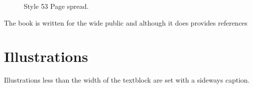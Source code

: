 \begin{figure}[ht]
\caption{Style 53 Page spread.}
\end{figure}

The book is written for the wide public and although it does provides references 
\lipsum

\section{Illustrations}

Illustrations less than the width of the textblock are set with a sideways caption.

